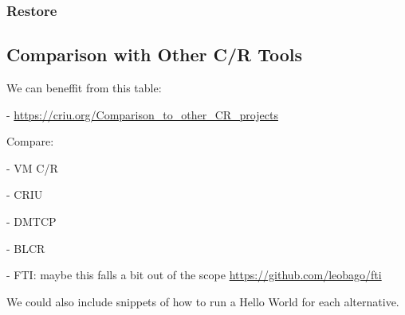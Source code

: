 \subsubsection*{Restore}

\subsection{Comparison with Other C/R Tools}

We can beneffit from this table:

- \url{https://criu.org/Comparison_to_other_CR_projects}

Compare:

- VM C/R

- CRIU

- DMTCP

- BLCR

- FTI: maybe this falls a bit out of the scope \url{https://github.com/leobago/fti}

We could also include snippets of how to run a Hello World for each alternative.


